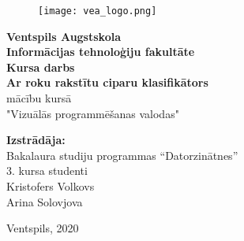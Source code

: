 \begin{titlepage}
    \begin{center}
        \begin{figure}[H]
            \centering
            \texttt{[image: vea\_logo.png]}
        \end{figure}
        \large
        \textbf{Ventspils Augstskola \\Informācijas tehnoloģiju fakultāte}
        \vspace*{4cm}
        \\
        \textbf{Kursa darbs} \\
        \LARGE
        \textbf{Ar roku rakstītu ciparu klasifikātors}
        \vspace{0.5cm}
        \large
        \\
        mācību kursā \\ "Vizuālās programmēšanas valodas"
    \end{center}

    \vspace{2cm}

    \begin{flushright}
        \normalsize
        \textbf{Izstrādāja:}\\
        Bakalaura studiju programmas “Datorzinātnes”\\
        3. kursa studenti\\
        Kristofers Volkovs \\
        Arina Solovjova \\
    \end{flushright}

    \vfill

    \begin{center}
        \Large
        Ventspils, 2020
    \end{center}

\end{titlepage}